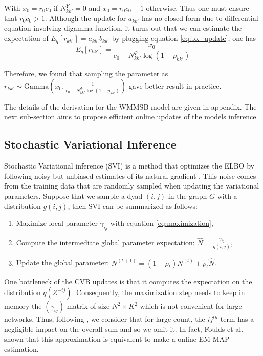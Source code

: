 With $x_0 = r_0 c_0$ if $N^Y_{kk'}=0$ and $x_0 = r_0 c_0 -1$ otherwise. Thus one must ensure that $r_0 c_0 > 1$. Although the update for $a_{kk'}$ has no closed form due to differential equation involving digamma function, it turns out that we can estimate the expectation of $E_q[r_{kk'}]=a_{kk'}b_{kk'}$ by plugging equation \eqref{eq:bk_update}, one has
\begin{equation} \label{eq:rk_update}
E_q[r_{kk'}] = \frac{x_0}{c_0  -N^\Phi_{kk'}\log(1-p_{kk'})}
\end{equation}

Therefore, we found  that sampling the parameter as $r_{kk'} \sim \textrm{Gamma}(x_0,\frac{1}{c_0  -N^\Phi_{kk'}\log(1-p_{kk'})} )$ gave better result in practice.

The details of the derivation for the WMMSB model are given in appendix.
The next sub-section aims to propose efficient online updates of the models inference.

\subsection{Stochastic Variational Inference}

Stochastic Variational inference (SVI) is a method that optimizes the ELBO by following noisy but unbiased estimates of its natural gradient \cite{hoffman2013stochastic}. This noise comes from the training data that are randomly sampled when updating the variational parameters. Suppose  that we sample a dyad $(i,j)$ in the graph $G$ with a distribution $g(i,j)$, then SVI can be summarized as follows:
\begin{enumerate}
\item Maximize local parameter $\gamma_{ij}$ with equation \eqref{eq:maximization},
\item Compute the intermediate global parameter expectation: $\hat N = \frac{\gamma_{ij}}{g(i,j)}$,
\item Update the global parameter: $N^{(t+1)} = (1-\rho_t)N^{(t)} + \rho_t \hat N$.
\end{enumerate}

One bottleneck of the CVB updates is that it computes the expectation on the distribution $q(Z^{-ij})$. Consequently, the maximization step needs to keep in memory the $(\gamma_{ij})$ matrix of size $N^2\times K^2$ which is not convenient for large networks. Thus, following \cite{foulds2013stochastic}, we consider that for large count, the $ij^{th}$ term has a negligible impact on the overall sum and so we omit it. In fact, Foulds et al. shown that this approximation is equivalent to make a online EM MAP estimation.


